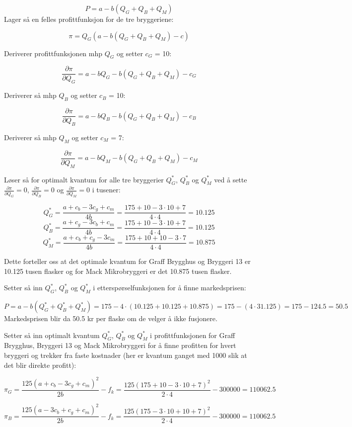\documentclass[
  12pt,
  a4paper,
  DIV=11,
  numbers=noendperiod]{scrartcl}
\begin{document}
\[P = a - b(Q_G+Q_B+Q_M) \tag{17}\] Lager så en felles profittfunksjon
for de tre bryggeriene:

\[\pi = Q_G(a-b(Q_G+Q_B+Q_M)-c) \tag{18}\]

Deriverer profittfunksjonen mhp \(Q_G\) og setter \(c_G\) = 10:

\[\frac{\partial \pi}{\partial Q_G} = a - bQ_G - b(Q_G+Q_B+Q_M) -c_G \tag{19}\]

Deriverer så mhp \(Q_B\) og setter \(c_B\) = 10:

\[\frac{\partial \pi}{\partial Q_B} = a - bQ_B - b(Q_G+Q_B+Q_M) -c_B \tag{20}\]

Deriverer så mhp \(Q_M\) og setter \(c_M\) = 7:

\[\frac{\partial \pi}{\partial Q_M} = a - bQ_M - b(Q_G+Q_B+Q_M) -c_M \tag{21}\]

Løser så for optimalt kvantum for alle tre bryggerier \(Q_G^*\),
\(Q_B^*\) og \(Q_M^*\) ved å sette
\(\frac{\partial \pi}{\partial Q_G} = 0\),
\(\frac{\partial \pi}{\partial Q_B} = 0\) og
\(\frac{\partial \pi}{\partial Q_M} = 0\) i tusener:

\[Q_G^* = \frac{a + c_b -3 c_g+c_m }{4b} = \frac{175 + 10 -3 \cdot 10+7 }{4 \cdot4} = 10.125 \tag{22}\]
\[Q_B^* = \frac{a + c_g -3 c_b+c_m }{4b} = \frac{175 + 10 -3 \cdot 10+7 }{4 \cdot4} = 10.125 \tag{23}\]
\[Q_M^* = \frac{a + c_b  +c_g-3c_m}{4b} = \frac{175 + 10 +10-3 \cdot 7 }{4 \cdot4} = 10.875 \tag{24}\]

Dette forteller oss at det optimale kvantum for Graff Brygghus og
Bryggeri 13 er 10.125 tusen flasker og for Mack Mikrobryggeri er det
10.875 tusen flasker.

Setter så inn \(Q_G^*\), \(Q_B^*\) og \(Q_M^*\) i etterspørselfunksjonen
for å finne markedsprisen:

\[P = a - b(Q_G^*+Q_B^*+Q_M^*) = 175 - 4 \cdot (10.125+10.125+10.875) = 175 - (4 \cdot 31.125)  = 175 - 124.5 = 50.5 \tag{25}\]
Markedsprisen blir da 50.5 kr per flaske om de velger å ikke fusjonere.

Setter så inn optimalt kvantum \(Q_G^*\), \(Q_B^*\) og \(Q_M^*\) i
profittfunksjonen for Graff Brygghus, Bryggeri 13 og Mack Mikrobryggeri
for å finne profitten for hvert bryggeri og trekker fra faste kostnader
(her er kvantum ganget med 1000 slik at det blir direkte profitt):

\[ \pi_G = \frac{125(a+c_b-3c_g+c_m)^2}{2b} -f_k = \frac{125(175+10-3 \cdot 10+7)^2}{2 \cdot 4} -300000 = 110062.5 \tag{26}\]

\[ \pi_B = \frac{125(a-3c_b+c_g+c_m)^2}{2b} -f_k = \frac{125(175-3 \cdot 10+10+7)^2}{2 \cdot 4} -300000 = 110062.5 \tag{27}\]
\end{document}
